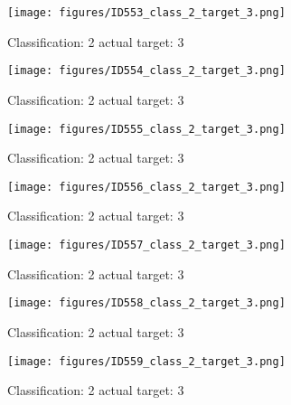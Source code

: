 \begin{figure}[h!]
\begin{center}
\texttt{[image: figures/ID553\_class\_2\_target\_3.png]}
\end{center}
\caption{ Classification: 2 actual target: 3}
\label{fig:ID553_class_2_target_3}
\end{figure}
\begin{figure}[h!]
\begin{center}
\texttt{[image: figures/ID554\_class\_2\_target\_3.png]}
\end{center}
\caption{ Classification: 2 actual target: 3}
\label{fig:ID554_class_2_target_3}
\end{figure}
\begin{figure}[h!]
\begin{center}
\texttt{[image: figures/ID555\_class\_2\_target\_3.png]}
\end{center}
\caption{ Classification: 2 actual target: 3}
\label{fig:ID555_class_2_target_3}
\end{figure}
\begin{figure}[h!]
\begin{center}
\texttt{[image: figures/ID556\_class\_2\_target\_3.png]}
\end{center}
\caption{ Classification: 2 actual target: 3}
\label{fig:ID556_class_2_target_3}
\end{figure}
\begin{figure}[h!]
\begin{center}
\texttt{[image: figures/ID557\_class\_2\_target\_3.png]}
\end{center}
\caption{ Classification: 2 actual target: 3}
\label{fig:ID557_class_2_target_3}
\end{figure}
\begin{figure}[h!]
\begin{center}
\texttt{[image: figures/ID558\_class\_2\_target\_3.png]}
\end{center}
\caption{ Classification: 2 actual target: 3}
\label{fig:ID558_class_2_target_3}
\end{figure}
\begin{figure}[h!]
\begin{center}
\texttt{[image: figures/ID559\_class\_2\_target\_3.png]}
\end{center}
\caption{ Classification: 2 actual target: 3}
\label{fig:ID559_class_2_target_3}
\end{figure}
